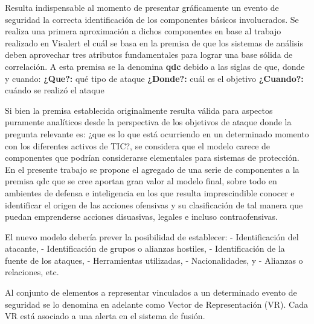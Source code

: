 \documentclass[a4paper]{./plantillas/llncs}
\begin{document}
Resulta indispensable al momento de presentar gráficamente un evento de seguridad la correcta identificación de los componentes básicos involucrados. Se realiza una primera aproximación a dichos componentes en base al trabajo realizado en Visalert \cite{b13} el cuál se basa en la premisa de que los sistemas de análisis deben aprovechar tres atributos fundamentales para lograr una base sólida de correlación. A esta premisa se la denomina {\bfseries  qdc} debido a las siglas de que, donde y cuando: \newline
{\bfseries ¿Que?:} qué tipo de ataque \newline
{\bfseries ¿Donde?:} cuál es el objetivo  \newline
{\bfseries ¿Cuando?:} cuándo se realizó el ataque \newline

Si bien la premisa establecida originalmente resulta válida para aspectos puramente analíticos desde la perspectiva de los objetivos de ataque donde la pregunta relevante es: ¿que es lo que está ocurriendo en un determinado momento con los diferentes activos de TIC?, se considera que el modelo carece de componentes que podrían considerarse elementales para sistemas de protección. En el presente trabajo se propone el agregado de una serie de componentes a la premisa qdc que se cree aportan gran valor al modelo final, sobre todo en ambientes de defensa e inteligencia en los que resulta imprescindible conocer e identificar el origen de las acciones ofensivas y su clasificación de tal manera que puedan emprenderse acciones disuasivas, legales e incluso contraofensivas. \newline

El nuevo modelo debería prever la posibilidad de establecer: \newline
- Identificación del atacante, \newline
- Identificación de grupos o alianzas hostiles, \newline
- Identificación de la fuente de los ataques, \newline
- Herramientas utilizadas, \newline
- Nacionalidades, y \newline
- Alianzas o relaciones, etc. \newline
	
Al conjunto de elementos a representar vinculados a un determinado evento de seguridad se lo denomina en adelante como Vector de Representación (VR). Cada VR está asociado a una alerta en el sistema de fusión. \newline
\end{document}
